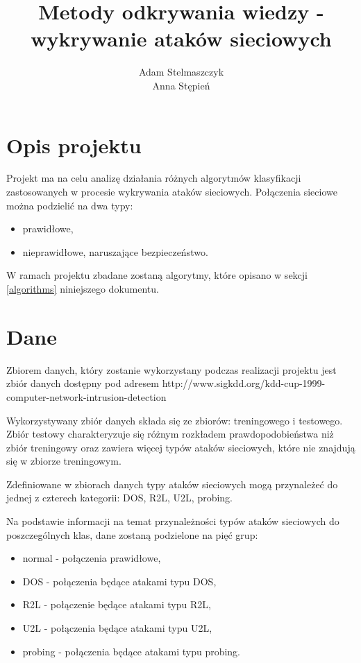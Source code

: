 \documentclass[a4paper, 12pt]{article}
\title {Metody odkrywania wiedzy - wykrywanie ataków sieciowych}
\author {Adam Stelmaszczyk\\ Anna Stępień}
\begin{document}
\maketitle

\tableofcontents

\newpage

\section{Opis projektu}
Projekt ma na celu analizę działania różnych algorytmów klasyfikacji zastosowanych
w procesie wykrywania ataków sieciowych. Połączenia sieciowe można podzielić na dwa typy:
\begin{itemize}
	\item prawidłowe,
	\item nieprawidłowe, naruszające bezpieczeństwo.
\end{itemize}
W ramach projektu zbadane zostaną algorytmy, które opisano w sekcji \ref{algorithms} niniejszego dokumentu.

\section{Dane}
Zbiorem danych, który zostanie wykorzystany podczas realizacji projektu jest zbiór danych dostępny pod adresem http://www.sigkdd.org/kdd-cup-1999-computer-network-intrusion-detection

Wykorzystywany zbiór danych składa się ze zbiorów: treningowego i testowego. Zbiór testowy charakteryzuje się różnym rozkładem prawdopodobieństwa niż zbiór treningowy oraz zawiera więcej typów ataków sieciowych, które nie znajdują się w zbiorze treningowym.

Zdefiniowane w zbiorach danych typy ataków sieciowych mogą przynależeć do jednej z czterech kategorii: DOS, R2L, U2L, probing.

Na podstawie informacji na temat przynależności typów ataków sieciowych do poszczególnych klas, dane zostaną podzielone na pięć grup:
\begin{itemize}
	\item normal - połączenia prawidłowe,
	\item DOS - połączenia będące atakami typu DOS,
	\item R2L - połączenie będące atakami typu R2L,
	\item U2L - połączenia będące atakami typu U2L,
	\item probing - połączenia będące atakami typu probing.
\end{itemize}
\end{document}

